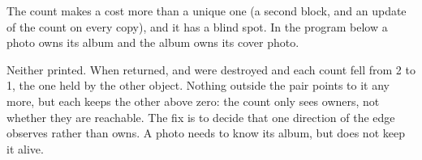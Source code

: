 The count makes a  cost more than a unique one (a second block, and an update of the count on every
copy), and it has a blind spot. In the program below a photo owns its album and the album owns its cover photo.

\label{lst:b2:cpp-copy-move:shared-cycle}

\label{out:b2:cpp-copy-move:shared-cycle}

Neither  printed. When  returned,  and  were destroyed and each count fell from
2 to 1, the one held by the other object. Nothing outside the pair points to it any more, but each keeps the other
above zero: the count only sees owners, not whether they are reachable. The fix is to decide that one direction of
the edge observes rather than owns. A photo needs to know its album, but does not keep it alive.

\label{lst:b2:cpp-copy-move:weak-fix}

\label{out:b2:cpp-copy-move:weak-fix}


